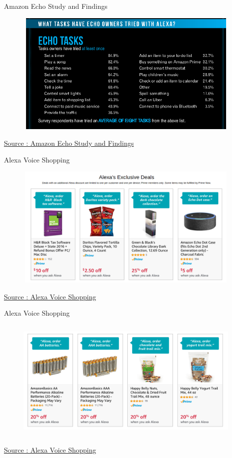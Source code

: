 \documentclass{beamer}
\begin{document}
\begin{frame}{Amazon Echo Study and Findings}
	\begin{figure}
	   \includegraphics[width=11cm, height=6cm]{figs/echo_tasks.png}
	\end{figure}

	\href{https://www.experian.com/innovation/thought-leadership/amazon-echo-consumer-survey.jsp}{Source : Amazon Echo Study and Findings}
\end{frame}


\begin{frame}{Alexa Voice Shopping}
	\begin{figure}
	   \includegraphics[width=11cm, height=6cm]{figs/alexa_deals_1.png}
	\end{figure}

	\href{https://www.amazon.com/b?node=14552177011}{Source : Alexa Voice Shopping}
\end{frame}


\begin{frame}{Alexa Voice Shopping}
	\begin{figure}
	   \includegraphics[width=11cm, height=6cm]{figs/alexa_deals_2.png}
	\end{figure}

	\href{https://www.amazon.com/b?node=14552177011}{Source : Alexa Voice Shopping}
\end{frame}
\end{document}
